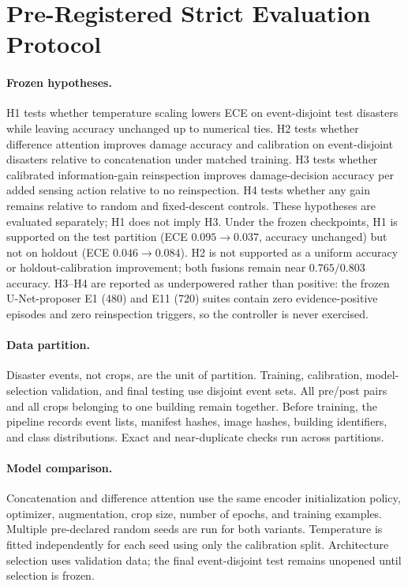 \section{Pre-Registered Strict Evaluation Protocol}
\label{app:protocol}

\paragraph{Frozen hypotheses.}
H1 tests whether temperature scaling lowers ECE on event-disjoint test disasters while leaving accuracy unchanged up to numerical ties.
H2 tests whether difference attention improves damage accuracy and calibration on event-disjoint disasters relative to concatenation under matched training.
H3 tests whether calibrated information-gain reinspection improves damage-decision accuracy per added sensing action relative to no reinspection.
H4 tests whether any gain remains relative to random and fixed-descent controls.
These hypotheses are evaluated separately; H1 does not imply H3.
Under the frozen checkpoints, H1 is supported on the test partition (ECE $0.095\rightarrow0.037$, accuracy unchanged) but not on holdout (ECE $0.046\rightarrow0.084$).
H2 is not supported as a uniform accuracy or holdout-calibration improvement; both fusions remain near $0.765/0.803$ accuracy.
H3--H4 are reported as underpowered rather than positive: the frozen U-Net-proposer E1 (480) and E11 (720) suites contain zero evidence-positive episodes and zero reinspection triggers, so the controller is never exercised.

\paragraph{Data partition.}
Disaster events, not crops, are the unit of partition.
Training, calibration, model-selection validation, and final testing use disjoint event sets.
All pre/post pairs and all crops belonging to one building remain together.
Before training, the pipeline records event lists, manifest hashes, image hashes, building identifiers, and class distributions.
Exact and near-duplicate checks run across partitions.

\paragraph{Model comparison.}
Concatenation and difference attention use the same encoder initialization policy, optimizer, augmentation, crop size, number of epochs, and training examples.
Multiple pre-declared random seeds are run for both variants.
Temperature is fitted independently for each seed using only the calibration split.
Architecture selection uses validation data; the final event-disjoint test remains unopened until selection is frozen.

